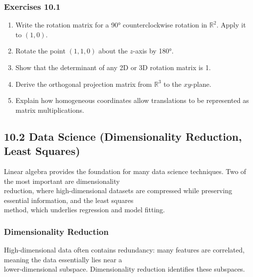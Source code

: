 \documentclass[
  12pt,
  a4paper,
]{article}
\begin{document}
\subsubsection{Exercises 10.1}\label{exercises-101}

\begin{enumerate}
\def\labelenumi{\arabic{enumi}.}
\item
  Write the rotation matrix for a 90° counterclockwise rotation in
  \(\mathbb{R}^2\). Apply it to \((1,0)\).
\item
  Rotate the point \((1,1,0)\) about the \(z\)-axis by 180°.
\item
  Show that the determinant of any 2D or 3D rotation matrix is 1.
\item
  Derive the orthogonal projection matrix from \(\mathbb{R}^3\) to the
  \(xy\)-plane.
\item
  Explain how homogeneous coordinates allow translations to be
  represented as matrix multiplications.
\end{enumerate}

\subsection{10.2 Data Science (Dimensionality Reduction, Least
Squares)}\label{102-data-science-dimensionality-reduction-least-squares}

Linear algebra provides the foundation for many data science techniques.
Two of the most important are dimensionality\\
reduction, where high-dimensional datasets are compressed while
preserving essential information, and the least squares\\
method, which underlies regression and model fitting.

\subsubsection{Dimensionality Reduction}\label{dimensionality-reduction}

High-dimensional data often contains redundancy: many features are
correlated, meaning the data essentially lies near a\\
lower-dimensional subspace. Dimensionality reduction identifies these
subspaces.
\end{document}

